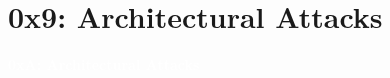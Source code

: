 \documentclass[aspectratio=169]{beamer}
\begin{document}
\section{0x9: Architectural Attacks}
{
\begin{frame}
\huge{\textcolor{white}{\textbf{0xA: Architectural Attacks}}}
\end{frame}
}
\end{document}
